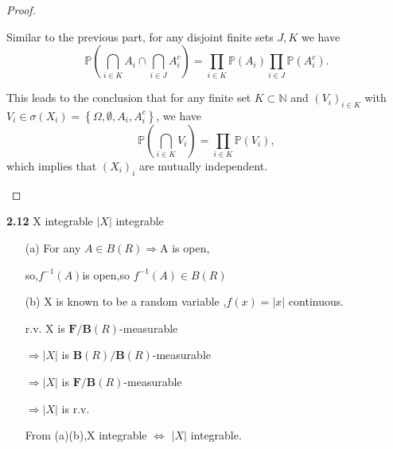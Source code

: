 \begin{proof}
\begin{enumerate}
\begin{enumerate}
        Similar to the previous part, for any disjoint finite sets $J, K$ we have
        $$\mathbb{P}\left(\bigcap_{i \in K} A_{i} \cap \bigcap_{i \in J} A_{i}^{c}\right)=\prod_{i \in K} \mathbb{P}\left(A_{i}\right) \prod_{i \in J} \mathbb{P}\left(A_{i}^{c}\right).$$

        This leads to the conclusion that for any finite set $K \subset \mathbb{N}$ and $\left(V_{i}\right)_{i \in K}$ with $V_{i} \in \sigma\left(X_{i}\right)=\left\{\Omega, \emptyset, A_{i}, A_{i}^{c}\right\}$,
        we have $$\mathbb{P}\left(\bigcap_{i \in K} V_{i}\right)=\prod_{i \in K} \mathbb{P}\left(V_{i}\right),$$
        which implies that $(X_i)_i$ are mutually independent.
    \end{enumerate}

\end{enumerate}

\end{proof}

\noindent\textbf{2.12} X integrable  $|X|$ integrable

\begin{enumerate}
    \item[(a)]For any $A\in B(R)\Rightarrow $A is open,

so,$f^{-1}(A)$is open,so $f^{-1}(A)\in B(R)$

\item[(b)]X is known to be a random variable ,$f(x)=|x|$ continuous.

r.v. X is $\textbf{F}/\textbf{B}(R)$-measurable

$\Rightarrow |X|$ is $\textbf{B}(R)/\textbf{B}(R)$-measurable

$\Rightarrow |X|$ is $\textbf{F}/\textbf{B}(R)$-measurable

$\Rightarrow |X|$ is r.v.

From (a)(b),X integrable $\Leftrightarrow$ $| X |$ integrable.
\end{enumerate}



